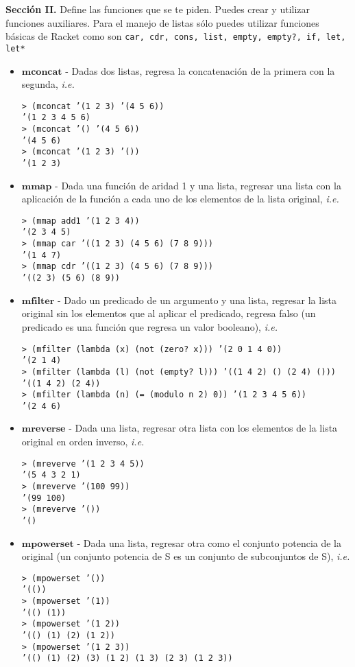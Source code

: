 \documentclass{article}
\begin{document}
\textbf{Sección II.} Define las funciones que se te piden. Puedes crear
y utilizar funciones auxiliares. Para el manejo de listas sólo puedes
utilizar funciones básicas de Racket como son \texttt{car, cdr, cons,
  list, empty, empty?, if, let, let*}

\begin{itemize}
\item $\textbf{mconcat}$ - Dadas dos listas, regresa la concatenación
  de la primera con la segunda, \textit{i.e.}
\begin{verbatim}
> (mconcat ’(1 2 3) ’(4 5 6))
’(1 2 3 4 5 6)
> (mconcat ’() ’(4 5 6))
’(4 5 6)
> (mconcat ’(1 2 3) ’())
’(1 2 3)
\end{verbatim}

\item $\textbf{mmap}$ - Dada una función de aridad 1 y una lista,
  regresar una lista con la aplicación de la función a cada uno de los
  elementos de la lista original, \textit{i.e.}
\begin{verbatim}
> (mmap add1 ’(1 2 3 4))
’(2 3 4 5)
> (mmap car ’((1 2 3) (4 5 6) (7 8 9)))
’(1 4 7)
> (mmap cdr ’((1 2 3) (4 5 6) (7 8 9)))
’((2 3) (5 6) (8 9))
\end{verbatim}

\item $\textbf{mfilter}$ - Dado un predicado de un argumento y una
  lista, regresar la lista original sin los elementos que al aplicar
  el predicado, regresa falso (un predicado es una función que
  regresa un valor booleano), \textit{i.e.}
\begin{verbatim}
> (mfilter (lambda (x) (not (zero? x))) ’(2 0 1 4 0))
’(2 1 4)
> (mfilter (lambda (l) (not (empty? l))) ’((1 4 2) () (2 4) ()))
’((1 4 2) (2 4))
> (mfilter (lambda (n) (= (modulo n 2) 0)) ’(1 2 3 4 5 6))
’(2 4 6)
\end{verbatim}

\item $\textbf{mreverse}$ - Dada una lista, regresar otra lista con
  los elementos de la lista original en orden inverso, \textit{i.e.}
\begin{verbatim}
> (mreverve ’(1 2 3 4 5))
’(5 4 3 2 1)
> (mreverve ’(100 99))
’(99 100)
> (mreverve ’())
’()
\end{verbatim}

\item $\textbf{mpowerset}$ - Dada una lista, regresar otra como el
  conjunto potencia de la original (un conjunto potencia de S es un
  conjunto de subconjuntos de S), \textit{i.e.}
\begin{verbatim}
> (mpowerset ’())
’(())
> (mpowerset ’(1))
’(() (1))
> (mpowerset ’(1 2))
’(() (1) (2) (1 2))
> (mpowerset ’(1 2 3))
’(() (1) (2) (3) (1 2) (1 3) (2 3) (1 2 3))
\end{verbatim}
\end{itemize}
\end{document}
